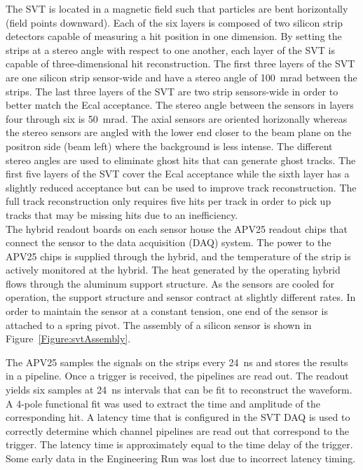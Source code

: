 The SVT is located in a magnetic field such that particles are bent horizontally (field points downward). Each of the six layers is composed of two silicon strip detectors capable of measuring a hit position in one dimension. By setting the strips at a stereo angle with respect to one another, each layer of the SVT is capable of three-dimensional hit reconstruction. The first three layers of the SVT are one silicon strip sensor-wide and have a stereo angle of 100~mrad between the strips. The last three layers of the SVT are two strip sensors-wide in order to better match the Ecal acceptance. The stereo angle between the sensors in layers four through six is 50~mrad. The axial sensors are oriented horizonally whereas the stereo sensors are angled with the lower end closer to the beam plane on the positron side (beam left) where the background is less intense. The different stereo angles are used to eliminate ghost hits that can generate ghost tracks. The first five layers of the SVT cover the Ecal acceptance while the sixth layer has a slightly reduced acceptance but can be used to improve track reconstruction. The full track reconstruction only requires five hits per track in order to pick up tracks that may be missing hits due to an inefficiency. \\
\indent The hybrid readout boards on each sensor house the APV25 readout chips that connect the sensor to the data acquisition (DAQ) system. The power to the APV25 chips is supplied through the hybrid, and the temperature of the strip is actively monitored at the hybrid. The heat generated by the operating hybrid  flows through the aluminum support structure. As the sensors are cooled for operation, the support structure and sensor contract at slightly different rates. In order to maintain the sensor at a constant tension, one end of the sensor is attached to a spring pivot. The assembly of a silicon sensor is shown in Figure~\ref{Figure:svtAssembly}.

The APV25 samples the signals on the strips every 24~ns and stores the results in a pipeline. Once a trigger is received, the pipelines are read out. The readout yields six samples at 24~ns intervals that can be fit to reconstruct the waveform. A 4-pole functional fit was used to extract the time and amplitude of the corresponding hit. A latency time that is configured in the SVT DAQ is used to correctly determine which channel pipelines are read out that correspond to the trigger. The latency time is approximately equal to the time delay of the trigger. Some early data in the Engineering Run was lost due to incorrect latency timing. 


